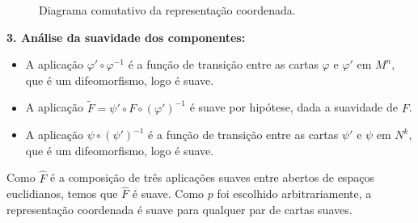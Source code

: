 {\begin{figure}[htbp]
		\caption{Diagrama comutativo da representação coordenada.}
	\end{figure}
	
	\textbf{3. Análise da suavidade dos componentes:}
	\begin{itemize}
		\item A aplicação $\varphi' \circ \varphi^{-1}$ é a função de transição entre as cartas $\varphi$ e $\varphi'$ em $M^n$, que é um difeomorfismo, logo é suave.
		\item A aplicação $\tilde{F} = \psi' \circ F \circ (\varphi')^{-1}$ é suave por hipótese, dada a suavidade de $F$.
		\item A aplicação $\psi \circ (\psi')^{-1}$ é a função de transição entre as cartas $\psi'$ e $\psi$ em $N^k$, que é um difeomorfismo, logo é suave.                        
	\end{itemize}
	
	Como $\hat{F}$ é a composição de três aplicações suaves entre abertos de espaços euclidianos, temos que $\hat{F}$ é suave. Como $p$ foi escolhido arbitrariamente, a representação coordenada é suave para qualquer par de cartas suaves.
}
